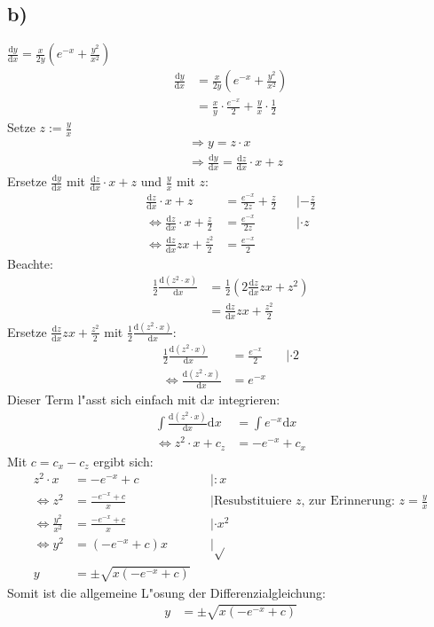 \documentclass{theozettel}
\newcommand{\difd}{\text{d}}
\begin{document}
\subsection*{b)}$\frac{\text{d}y}{\text{d}x} = \frac{x}{2y}\left(e^{-x}+\frac{y^2}{x^2}\right)$\\
\begin{align*}
\frac{\text{d}y}{\text{d}x}&=\frac{x}{2y}\left(e^{-x}+\frac{y^2}{x^2}\right)\\
&=\frac{x}{y}\cdot\frac{e^{-x}}{2}+\frac{y}{x}\cdot\frac{1}{2}
\end{align*}
Setze $z:=\frac{y}{x}$\\ 
\begin{align*}
&\Rightarrow y=z\cdot x\\
&\Rightarrow \frac{\text{d}y}{\text{d}x}=\frac{\text{d}z}{\text{d}x}\cdot x +z
\end{align*}
Ersetze $\frac{\text{d}y}{\text{d}x}$ mit $\frac{\text{d}z}{\text{d}x}\cdot x+z$ und $\frac{y}{x}$ mit $z$:
\begin{align*}
\frac{\text{d}z}{\text{d}x}\cdot x +z&=\frac{e^{-x}}{2z}+\frac{z}{2} &&|-\frac{z}{2}\\
\Leftrightarrow\frac{\text{d}z}{\text{d}x}\cdot x +\frac{z}{2}&=\frac{e^{-x}}{2z} &&|\cdot z\\
\Leftrightarrow\frac{\difd z}{\difd x}zx+\frac{z^{2}}{2}&=\frac{e^{-x}}{2}
\end{align*}
Beachte:
\begin{align*}
\frac{1}{2}\frac{\text{d}\left(z^2\cdot x\right)}{\text{d}x}&=\frac{1}{2}\left(2\frac{\text{d}z}{\text{d}x}zx+z^{2}\right)\\
&=\frac{\difd z}{\difd x}zx+\frac{z^{2}}{2}
\end{align*}
Ersetze $\frac{\difd z}{\difd x}zx+\frac{z^{2}}{2}$ mit $\frac{1}{2}\frac{\text{d}\left(z^2\cdot x\right)}{\text{d}x}$:
\begin{align*}
\frac{1}{2}\frac{\text{d}\left(z^2\cdot x\right)}{\text{d}x}&=\frac{e^{-x}}{2}&&|\cdot 2\\
\Leftrightarrow\frac{\difd \left(z^2\cdot x\right)}{\difd x}&=e^{-x}
\end{align*}
Dieser Term l"asst sich einfach mit d$x$ integrieren:
\begin{align*}
\int\frac{\difd \left(z^2\cdot x\right)}{\difd x}\difd x &=\int e^{-x}\difd x\\
\Leftrightarrow z^2\cdot x +c_z&=-e^{-x}+c_x
\end{align*}
Mit $c=c_x-c_z$ ergibt sich:
\begin{align*}
z^2\cdot x &=-e^{-x}+c&&|:x\\
\Leftrightarrow z^2&=\frac{-e^{-x}+c}{x}&&|\text{Resubstituiere $z$, zur Erinnerung: $z=\frac{y}{x}$}\\
\Leftrightarrow\frac{y^2}{x^2}&=\frac{-e^{-x}+c}{x}&&|\cdot x^2\\
\Leftrightarrow y^2&=\left(-e^{-x}+c\right)x &&|\sqrt{}\\
y&= \pm\sqrt{x\left(-e^{-x}+c\right)}
\end{align*}
Somit ist die allgemeine L"osung der Differenzialgleichung:
\begin{align*}
y&= \pm\sqrt{x\left(-e^{-x}+c\right)}
\end{align*}
\end{document}
